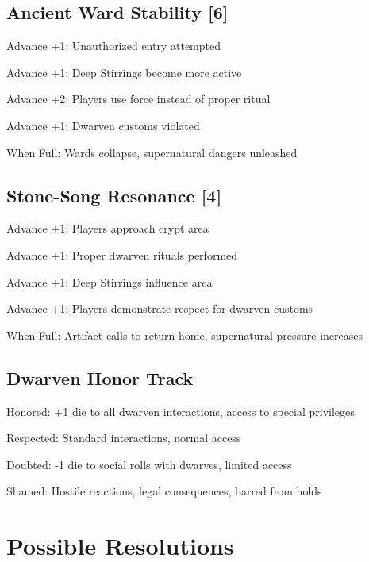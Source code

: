 \documentclass[11pt]{article}
\newenvironment{mechanics}{\begin{description}[leftmargin=*,style=standard]}{\end{description}}
\begin{document}
\subsection{Ancient Ward Stability [6]}
\begin{mechanics}
\item[Advance +1:] Unauthorized entry attempted
\item[Advance +1:] Deep Stirrings become more active
\item[Advance +2:] Players use force instead of proper ritual
\item[Advance +1:] Dwarven customs violated
\item[When Full:] Wards collapse, supernatural dangers unleashed
\end{mechanics}

\subsection{Stone-Song Resonance [4]}
\begin{mechanics}
\item[Advance +1:] Players approach crypt area
\item[Advance +1:] Proper dwarven rituals performed
\item[Advance +1:] Deep Stirrings influence area
\item[Advance +1:] Players demonstrate respect for dwarven customs
\item[When Full:] Artifact calls to return home, supernatural pressure increases
\end{mechanics}

\subsection{Dwarven Honor Track}
\begin{mechanics}
\item[Honored:] +1 die to all dwarven interactions, access to special privileges
\item[Respected:] Standard interactions, normal access
\item[Doubted:] -1 die to social rolls with dwarves, limited access
\item[Shamed:] Hostile reactions, legal consequences, barred from holds
\end{mechanics}

\section{Possible Resolutions}
\end{document}
